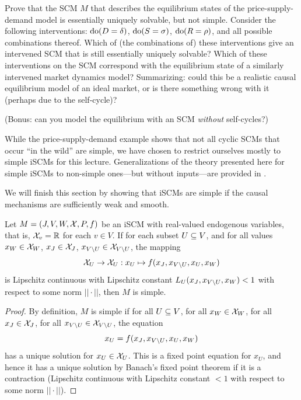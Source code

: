 \begin{Exc}
  Prove that the SCM $M$ that describes the equilibrium states of the price-supply-demand model is essentially uniquely solvable, but not simple. 
  Consider the following interventions: $\operatorname{do}(D=\delta)$, $\operatorname{do}(S=\sigma)$, $\operatorname{do}(R=\rho)$, and all possible combinations thereof. Which of (the combinations of) these interventions give an intervened SCM that is still essentially uniquely solvable?
  Which of these interventions on the SCM correspond with the equilibrium state of a similarly intervened market dynamics model?
  Summarizing: could this be a realistic causal equilibrium model of an ideal market, or is there something wrong with it (perhaps due to the self-cycle)?

  (Bonus: can you model the equilibrium with an SCM \emph{without} self-cycles?)
\end{Exc}

While the price-supply-demand example shows that not all cyclic SCMs that occur ``in the wild'' are simple, we have chosen
to restrict ourselves mostly to simple iSCMs for this lecture. Generalizations of the theory presented here for simple iSCMs 
to non-simple ones---but without inputs---are provided in \cite{BFPM21}.

We will finish this section by showing that iSCMs are simple if the causal mechanisms are sufficiently weak and smooth.
\begin{Prp}\label{prp:simple_scm_contraction}
  Let $M = \left ( J, V, W, \mathcal{X}, P, f \right )$ be an iSCM with real-valued endogenous variables, that is, $\mathcal{X}_v = \mathbb{R}$ for each $v \in V$.
  If for each subset $U \subseteq V$, and for all values $x_{W}\in\mathcal{X}_{W}$, $x_{J} \in \mathcal{X}_{J}$, $x_{V\setminus U} \in \mathcal{X}_{V\setminus U}$, the mapping
  \begin{equation*}
  \mathcal{X}_U \to \mathcal{X}_U : x_U \mapsto f(x_{J},x_{V\setminus U},x_U,x_{W})
  \end{equation*}
  is Lipschitz continuous with Lipschitz constant $L_U(x_{J},x_{V\setminus U},x_{W}) < 1$ with respect to some norm $||\cdot||$, then $M$ is simple.
\end{Prp}
\begin{proof}
  By definition, $M$ is simple if for all $U \subseteq V$, for all $x_{W}\in\mathcal{X}_{W}$, for all $x_{J} \in \mathcal{X}_{J}$, for all $x_{V\setminus U} \in \mathcal{X}_{V\setminus U}$, the equation
  \begin{equation}\label{eq:simple_scm_contraction}
    x_U = f(x_{J},x_{V\setminus U},x_U,x_{W})
  \end{equation}
  has a unique solution for $x_U\in\mathcal{X}_U$.
  This is a fixed point equation for $x_U$, and hence it has a unique solution by Banach's fixed point theorem if it is a contraction (Lipschitz continuous with Lipschitz constant $<1$ with respect to some norm $||\cdot||$).
\end{proof}

